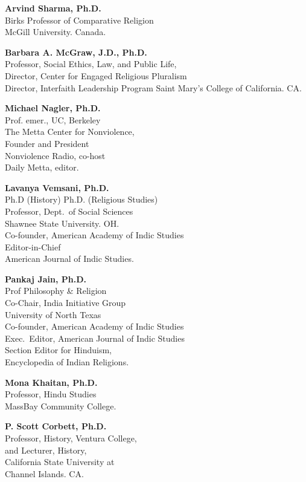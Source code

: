 \textbf{Arvind Sharma, Ph.D.}\\ 
Birks Professor of Comparative Religion\\ 
McGill University. Canada.
\medskip
 
\textbf{Barbara A. McGraw, J.D., Ph.D.}\\ 
Professor, Social Ethics, Law, and Public Life,\\[2pt]
Director, Center for Engaged Religious Pluralism\\[2pt]
Director, Interfaith Leadership Program
Saint Mary’s College of California. CA.
\medskip
 

\textbf{Michael Nagler, Ph.D.}\\
Prof. emer., UC, Berkeley\\
The Metta Center for Nonviolence,\\ 
Founder and President\\
Nonviolence Radio, co-host\\ 
Daily Metta, editor.
\medskip
 
\textbf{Lavanya Vemsani, Ph.D.}\\ 
Ph.D (History) Ph.D. (Religious Studies)\\
Professor, Dept.\ of Social Sciences\\
Shawnee State University. OH.\\ 
Co-founder, American Academy of Indic Studies\\ 
Editor-in-Chief\\ 
American Journal of Indic Studies.
\medskip
 

\textbf{Pankaj Jain, Ph.D.}\\ 
Prof Philosophy \& Religion\\
Co-Chair, India Initiative Group\\
University of North Texas\\[2pt]
Co-founder, American Academy of Indic Studies\\[2pt]
Exec.\ Editor, American Journal of Indic Studies\\
Section Editor for Hinduism,\\[2pt] 
Encyclopedia of Indian Religions.
\medskip
 

\textbf{Mona Khaitan, Ph.D.}\\ 
Professor, Hindu Studies\\
MassBay Community College.
\medskip
 
\textbf{P. Scott Corbett, Ph.D.}\\ 
Professor, History, Ventura College,\\ 
and Lecturer, History,\\ 
California State University at\\ 
Channel Islands. CA. 
\medskip
 

